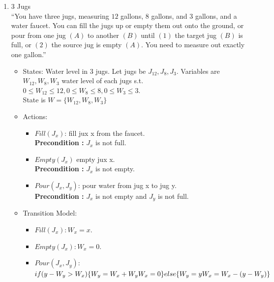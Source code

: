 \documentclass[12pt, a4paper]{article}
\begin{document}
	\begin{enumerate}
		\item 3 Jugs\\
		 “You have three jugs, measuring $12$ gallons, $8$ gallons, and $3$ gallons, and a water faucet.  You can fill the jugs up or empty them out onto the ground, or pour from one jug $(A)$ to another $(B)$ until $(1)$ the target jug $(B)$ is full, or $(2)$ the source jug is empty $(A)$. You need to measure out exactly one gallon.”
		
		\begin{itemize}
			\item States: Water level in 3 jugs. Let jugs be $J_{12}, J_{8}, J_{3}$. Variables are $W_{12}, W_{8}, W_{3}$ water level of each jugs s.t.\\   $0 \leq W_{12} \leq 12, 0 \leq W_{8} \leq 8, 0 \leq  W_{3} \leq 3$. \\ State is $W = \{W_12, W_8, W_3\}$
			
			\item Actions:
			\begin{itemize}
				\item $Fill(J_x)$: fill jux x from the faucet.\\ \textbf{Precondition :} $J_x$ is not full.
				
				\item $Empty(J_x)$ empty jux x.\\
				\textbf{Precondition :} $J_x$ is not empty.
				
				\item $Pour(J_x, J_y)$: pour water from jug x to jug y.\\
				\textbf{Precondition :} $J_x$ is not empty and $J_y$ is not full.
			\end{itemize}
		\item Transition Model:
		\begin{itemize}
			\item $Fill(J_x): W_x = x$.
			\item $Empty(J_x): W_x = 0$.
			\item $Pour(J_x, J_y):$\\
			$if (y - W_y > W_x)\{\\
			 W_y = W_x + W_y\\
			W_x = 0\\
			\} else\{\\
			W_y = y\\
			W_x = W_x - (y - W_y)
			\}$
			
		\end{itemize}
	

\end{itemize}
\end{enumerate}
\end{document}
